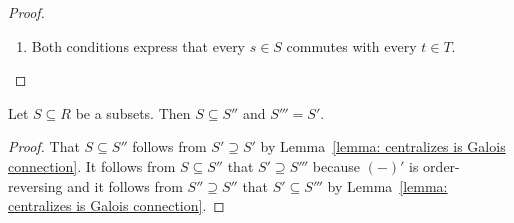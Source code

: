 \begin{proof}
  \leavevmode
  \begin{enumerate}[start = 2]
    \item
      Both conditions express that every $s \in S$ commutes with every $t \in T$.
    \qedhere
  \end{enumerate}
\end{proof}


\begin{corollary}
  Let $S \subseteq R$ be a subsets.
  Then $S \subseteq S''$ and $S''' = S'$.
\end{corollary}


\begin{proof}
  That $S \subseteq S''$ follows from $S' \supseteq S'$ by Lemma~\ref{lemma: centralizes is Galois connection}.
  It follows from $S \subseteq S''$ that $S' \supseteq S'''$ because $(-)'$ is order-reversing and it follows from $S'' \supseteq S''$ that $S' \subseteq S'''$ by Lemma~\ref{lemma: centralizes is Galois connection}.
\end{proof}


